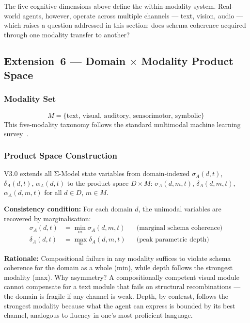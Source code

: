 \documentclass[10pt]{article}
\begin{document}
The five cognitive dimensions above define the within-modality system.
Real-world agents, however, operate across multiple channels --- text,
vision, audio --- which raises a question addressed in this section:
does schema coherence acquired through one modality transfer to another?

\subsection{Extension~6 --- Domain \texorpdfstring{$\times$}{x} Modality Product Space}\label{sec:product-space}

\subsubsection{Modality Set}
\begin{equation}\label{eq:modalities}
M = \{\text{text, visual, auditory, sensorimotor, symbolic}\}
\end{equation}
This five-modality taxonomy follows the standard multimodal machine learning survey~\citep{baltrušaitis2018multimodal}.
 
\subsubsection{Product Space Construction}

V3.0 extends all Σ-Model state variables from domain-indexed
$\sigma_A(d, t)$, $\delta_A(d, t)$, $\alpha_A(d, t)$ to the product space $D \times M$:
$\sigma_A(d, m, t)$, $\delta_A(d, m, t)$, $\alpha_A(d, m, t)$ for all $d \in D$, $m \in M$.

\textbf{Consistency condition:} For each domain $d$, the unimodal variables
are recovered by marginalisation:
\begin{align}
\sigma_A(d, t) &= \min_m \sigma_A(d, m, t) & &\text{(marginal schema coherence)} \label{eq:marginal-sigma} \\
\delta_A(d, t) &= \max_m \delta_A(d, m, t) & &\text{(peak parametric depth)} \label{eq:marginal-delta}
\end{align}

\textbf{Rationale:} Compositional failure in any modality suffices to
violate schema coherence for the domain as a whole (min), while
depth follows the strongest modality (max). Why asymmetry? A
compositionally competent visual module cannot compensate for a text
module that fails on structural recombinations --- the domain is
fragile if any channel is weak. Depth, by contrast, follows the
strongest modality because what the agent can express is bounded by
its best channel, analogous to fluency in one's most proficient language.
\end{document}
